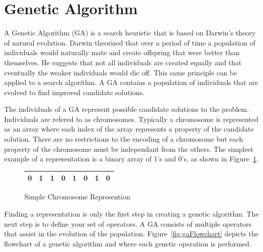 \section{Genetic Algorithm}

A Genetic Algorithm (GA) is a search heuristic that is based on Darwin's theory of natural evolution. Darwin theorized that over a period of time a population of individuals would naturally mate and create offspring that were better than themselves. He suggests that not all individuals are created equally and that eventually the weaker individuals would die off. This same principle can be applied to a search algorithm. A GA contains a population of individuals that are evolved to find improved candidate solutions.

The individuals of a GA represent possible candidate solutions to the problem. Individuals are refered to as chromosomes. Typically a chromosome is represented as an array where each index of the array represents a property of the candidate solution. There are no restrictions to the encoding of a chromosome but each property of the chromosome must be independant from the others. The simplest example of a representation is a binary array of 1's and 0's, as shown in Figure~\ref{fig:sampleChromosome}.

\begin{figure}[H]
  \label{fig:sampleChromosome}
  \centering
  \begin{tabular}{ | l | l | l | l | l | l | l | l | }
    \hline
    0 & 1 & 1 & 0 & 1 & 0 & 1 & 0 \\
    \hline
  \end{tabular}
  \caption{Simple Chromosome Represention}
\end{figure}

Finding a representation is only the first step in creating a genetic algorithm. The next step is to define your set of operators. A GA consists of multiple operators that assist in the evolution of the population. Figure~\ref{fig:gaFlowchart} depicts the flowchart of a genetic algorithm and where each genetic operation is performed.

